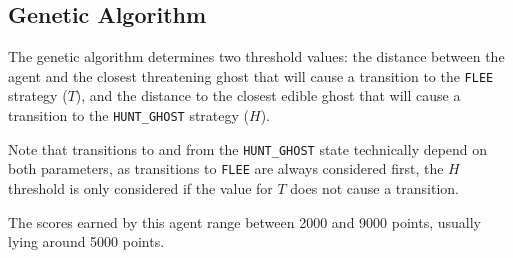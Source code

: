 \subsection{Genetic Algorithm}
The genetic algorithm determines two threshold values: the distance
between the agent and the closest threatening ghost that will cause a transition
to the \texttt{FLEE} strategy ($T$), and the distance to the closest edible
ghost that will cause a transition to the \texttt{HUNT\_GHOST} strategy ($H$).

Note that transitions to and from the \texttt{HUNT\_GHOST} state technically
depend on both parameters, as transitions to \texttt{FLEE} are always considered
first, the $H$ threshold is only considered if the value for $T$ does not cause
a transition.

The scores earned by this agent range between 2000 and 9000 points, usually
lying around 5000 points.


